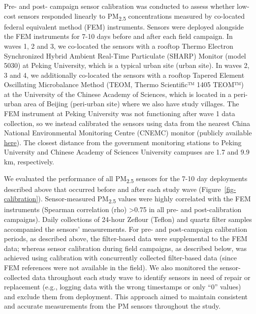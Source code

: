 \documentclass[
  letterpaper,
  DIV=11,
  numbers=noendperiod]{scrartcl}
\begin{document}
Pre- and post- campaign sensor calibration  was conducted
to assess whether low-cost sensors responded linearly to
PM\textsubscript{2.5} concentrations measured by co-located federal
equivalent method (FEM) instruments. Sensors were deployed alongside the
FEM instruments for 7-10 days before and after each field campaign. In
waves 1, 2 and 3, we co-located the sensors with a rooftop Thermo
Electron Synchronized Hybrid Ambient Real-Time Particulate (SHARP)
Monitor (model 5030) at Peking University, which is a typical urban site
(urban site). In waves 2, 3 and 4, we additionally co-located the
sensors with a rooftop Tapered Element Oscillating Microbalance Method
(TEOM, Thermo Scientific™ 1405 TEOM™) at the University of the Chinese
Academy of Sciences, which is located in a peri-urban area of Beijing
(peri-urban site) where we also have study villages. The FEM instrument
at Peking University was not functioning after wave 1 data collection,
so we instead calibrated the sensors using data from the nearest China
National Environmental Monitoring Centre (CNEMC) monitor (publicly
available \href{https://quotsoft.net/air}{here}). The closest distance
from the government monitoring stations to Peking University and Chinese
Academy of Sciences University campuses are 1.7 and 9.9 km,
respectively.

We  evaluated the performance of all
PM\textsubscript{2.5} sensors for the 7-10 day deployments described
above that occurred before and after each study wave
(Figure~\ref{fig-calibration}). Sensor-measured PM\textsubscript{2.5}
values were highly correlated with the FEM instruments (Spearman
correlation (rho) \textgreater0.75 in all pre- and post-calibration
campaigns). Daily collections of 24-hour Zeflour (Teflon) and quartz
filter samples accompanied the sensors' measurements. For pre- and
post-campaign calibration periods, as described above, the filter-based
data were supplemental to the FEM data; whereas sensor calibration
during field campaigns, as described below, was achieved using
calibration with concurrently collected filter-based data (since FEM
references were not available in the field). We also monitored the
sensor-collected data throughout each study wave to identify sensors in
need of repair or replacement (e.g., logging data with the wrong
timestamps or only ``0'' values) and exclude them from deployment. This
approach aimed to maintain consistent and accurate measurements from the
PM sensors throughout the study.
\end{document}
